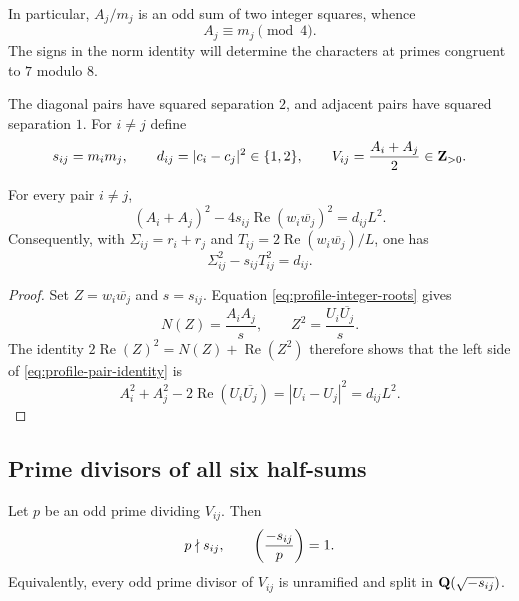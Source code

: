 In particular, $A_j/m_j$ is an odd sum of two integer squares, whence
\begin{equation}\label{eq:profile-radius-residue}
 A_j\equiv m_j\pmod4.
\end{equation}
The signs in the norm identity will determine the characters at primes
congruent to $7$ modulo $8$.

The diagonal pairs have squared separation $2$, and adjacent pairs have
squared separation $1$.  For $i\ne j$ define
\begin{equation}\label{eq:profile-pair-data}
 s_{ij}=m_im_j,\qquad d_{ij}=|c_i-c_j|^2\in\{1,2\},\qquad
 V_{ij}=\frac{A_i+A_j}{2}\in\mathbf Z_{>0}.
\end{equation}

\begin{lemma}\label{lem:profile-pair-identity}
For every pair $i\ne j$,
\begin{equation}\label{eq:profile-pair-identity}
 (A_i+A_j)^2-
 4s_{ij}\operatorname{Re}(w_i\overline{w_j})^2=d_{ij}L^2.
\end{equation}
Consequently, with $\Sigma_{ij}=r_i+r_j$ and
$T_{ij}=2\operatorname{Re}(w_i\overline{w_j})/L$, one has
\[
 \Sigma_{ij}^2-s_{ij}T_{ij}^2=d_{ij}.
\]
\end{lemma}

\begin{proof}
Set $Z=w_i\overline{w_j}$ and $s=s_{ij}$.  Equation
\eqref{eq:profile-integer-roots} gives
\[
 N(Z)=\frac{A_iA_j}{s},\qquad
 Z^2=\frac{U_i\overline{U_j}}{s}.
\]
The identity $2\operatorname{Re}(Z)^2=N(Z)+\operatorname{Re}(Z^2)$
therefore shows that the left side of
\eqref{eq:profile-pair-identity} is
\[
 A_i^2+A_j^2-2\operatorname{Re}(U_i\overline{U_j})
 =|U_i-U_j|^2=d_{ij}L^2.
\]
\end{proof}

\subsection{Prime divisors of all six half-sums}

\begin{theorem}\label{thm:profile-six-pair-support}
Let $p$ be an odd prime dividing $V_{ij}$.  Then
\begin{equation}\label{eq:profile-six-pair-support}
 p\nmid s_{ij},\qquad \left(\frac{-s_{ij}}{p}\right)=1.
\end{equation}
Equivalently, every odd prime divisor of $V_{ij}$ is unramified and
split in $\mathbf Q(\sqrt{-s_{ij}})$.
\end{theorem}

